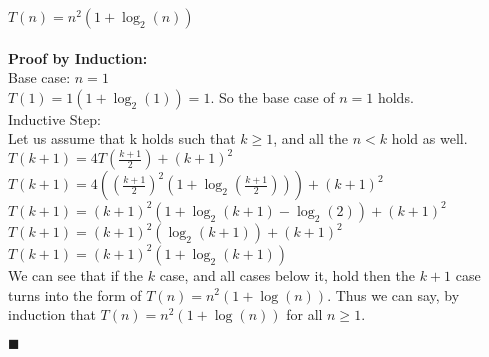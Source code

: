 \documentclass[11pt]{article}
\begin{document}
$\boxed{T(n) = n^2(1+\log_2(n))}$\\\\

{\bf Proof by Induction:}\\
Base case: $n=1$\\
$T(1) = 1(1+\log_2(1)) = 1$. So the base case of $n=1$ holds.\\

Inductive Step:\\
Let us assume that k holds such that $k\geq 1$, and all the $n < k$ hold as well.\\
$T(k+1) = 4T(\frac{k+1}{2}) + (k+1)^2$\\
$T(k+1) = 4((\frac{k+1}{2})^2(1+\log_2(\frac{k+1}{2})))+(k+1)^2$\\
$T(k+1) = (k+1)^2(1+\log_2(k+1) - \log_2(2)) + (k+1)^2$\\
$T(k+1) = (k+1)^2(\log_2(k+1))+(k+1)^2$\\
$T(k+1) = (k+1)^2(1+ \log_2(k+1))$\\

We can see that if the $k$ case, and all cases below it, hold then the $k+1$ case turns into the form of $T(n) = n^2(1+\log(n))$. Thus we can say, by induction that $\boxed{T(n) = n^2(1+\log(n))}$ for all $n \geq 1$.
\begin{flushright}$\blacksquare$\end{flushright}
\end{document}
